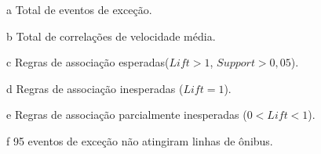 \documentclass[
	12pt,				%
	oneside,			%
	a4paper,			%
	english,			%
	brazil				%
	]{abntex2ppgsi}
\begin{document}
{{{\begin{apendicesenv}
\begin{table}[!htb]
\begin{threeparttable}
\begin{tablenotes}
            \item[a] Total de eventos de exceção.
            \item[b] Total de correlações de velocidade média.
            \item[c] Regras de associação esperadas($Lift > 1$, $Support > 0,05$).
            \item[d] Regras de associação inesperadas ($Lift = 1$).
            \item[e] Regras de associação parcialmente inesperadas ($0 < Lift < 1$).
            \item[f] 95 eventos de exceção não atingiram linhas de ônibus.
        \end{tablenotes}
\end{threeparttable}
\end{table}



\end{apendicesenv}}}}
\end{document}
